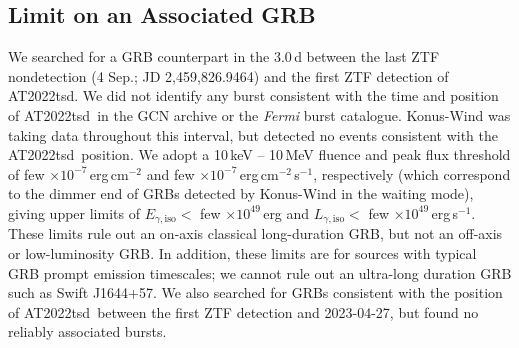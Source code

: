 \documentclass{nature_plusfigure}
\newcommand{\at}{AT2022tsd}
\begin{document}
\begin{methods}


\section{Limit on an Associated GRB}
\label{sec:grbsearch}

We searched for a GRB counterpart in the 3.0\,d between the last ZTF nondetection (4 Sep.; JD 2,459,826.9464) and the first ZTF detection of \at. We did not identify any burst consistent with the time and position of \at\ in the GCN archive or the {\it Fermi} burst catalogue. Konus-Wind was taking data throughout this interval, but detected no events consistent with the \at\ position. 
We adopt a 10\,keV -- 10\,MeV fluence and peak flux threshold of few $\times10^{-7}$\,erg\,cm$^{-2}$ and few $\times10^{-7}$\,erg\,cm$^{-2}$\,s$^{-1}$,
respectively (which correspond to the dimmer end of GRBs detected by Konus-Wind in the waiting mode\cite{Tsvetkova2021}),
giving upper limits of $E_{\gamma,\mathrm{iso}} <$ few $\times 10^{49}$\,erg and $L_{\gamma,\mathrm{iso}} <$ few $\times10^{49}$\,erg\,s$^{-1}$. 
These limits rule out an on-axis classical long-duration GRB, but not an off-axis or low-luminosity GRB\cite{Cano2017}.
In addition, these limits are for sources with typical GRB prompt emission timescales; we cannot rule out an ultra-long duration GRB such as Swift J1644+57.
We also searched for GRBs consistent with the position of \at\ between the first ZTF detection and 2023-04-27, but found no reliably associated bursts.


\end{methods}
\end{document}
